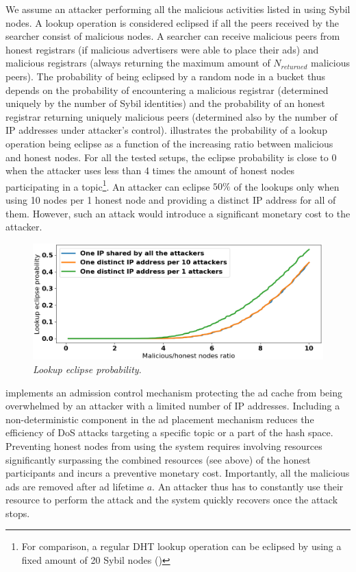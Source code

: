 We assume an attacker performing all the malicious activities listed in  using Sybil nodes. A lookup operation is considered eclipsed if all the peers received by the searcher consist of malicious nodes. A searcher can receive malicious peers from honest registrars (if malicious advertisers were able to place their ads) and malicious registrars (always returning the maximum amount of $N_\textit{returned}$ malicious peers). The probability of being eclipsed by a random node in a bucket thus depends on the probability of encountering a malicious registrar (determined uniquely by the number of Sybil identities) and the probability of an honest registrar returning uniquely malicious peers (determined also by the number of IP addresses under attacker's control).  illustrates the probability of a lookup operation being eclipse as a function of the increasing ratio between malicious and honest nodes. For all the tested setups, the eclipse probability is close to $0$ when the attacker uses less than 4 times the amount of honest nodes participating in a topic\footnote{For comparison, a regular DHT lookup operation can be eclipsed by using a fixed amount of 20 Sybil nodes ()}. An attacker can eclipse $50\%$  of the lookups only when using 10 nodes per 1 honest node and providing a distinct IP address for all of them. However, such an attack would introduce a significant monetary cost to the attacker.

\begin{figure}[t]
    \includegraphics[width=1\linewidth]{img/eclipse_probability}
    \vspace{-0.05in}
    \caption{\emph{Lookup eclipse probability}.
    }
    \label{fig:eclipse_probability}
    \vspace{-0.20in}
\end{figure}

\sysname implements an admission control mechanism protecting the ad cache from being overwhelmed by an attacker with a limited number of IP addresses. Including a non-deterministic component in the ad placement mechanism reduces the efficiency of DoS attacks targeting a specific topic or a part of the hash space. Preventing honest nodes from using the system requires involving resources significantly surpassing the combined resources (see above) of the honest participants and incurs a preventive monetary cost. Importantly, all the malicious ads are removed after ad lifetime $a$. An attacker thus has to constantly use their resource to perform the attack and the system quickly recovers once the attack stops.